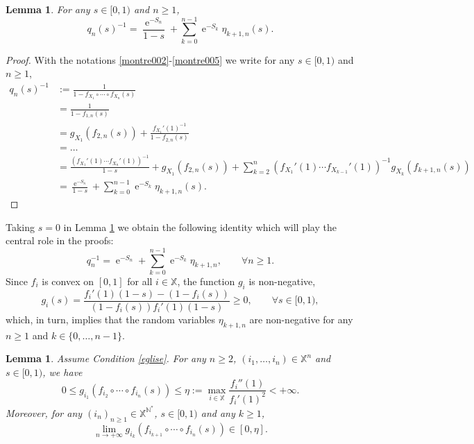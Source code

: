\documentclass[12pt]{amsart}
\newtheorem{lemma}[theorem]{Lemma}
\theoremstyle{definition}
\numberwithin{equation}{section}
\def\bb#1{\mathbb{#1}}
\def\geq{\geqslant}
\def\leq{\leqslant}
\DeclareMathOperator{\e}{e}
\begin{document}
\begin{lemma}
\label{foin}
For any $s\in [0,1)$ and $n \geq 1$,
\[
q_n(s)^{-1} = \frac{\e^{-S_n}}{1-s} + \sum_{k=0}^{n-1} \e^{-S_k} \eta_{k+1,n}(s).
\]
\end{lemma}

\begin{proof}
With the notations \eqref{montre002}-\eqref{montre005} we write for any $s\in [0,1)$ and $n \geq 1$,
\begin{align*}
	q_n(s)^{-1} &:= \frac{1}{1-f_{X_1} \circ \cdots \circ f_{X_n} (s)} \nonumber\\
	&= \frac{1}{1-f_{1,n} (s)} \nonumber\\
	&= g_{X_1} \left( f_{2,n}(s) \right) + \frac{f_{X_1}'(1)^{-1}}{1-f_{2,n}(s)} \nonumber\\
	&= \dots \nonumber\\
	&= \frac{\left( f_{X_1}'(1) \cdots f_{X_n}'(1) \right)^{-1}}{1-s} + g_{X_1} \left( f_{2,n}(s) \right) + \sum_{k=2}^{n} \left( f_{X_1}'(1) \cdots f_{X_{k-1}}'(1) \right)^{-1} g_{X_k} \left( f_{k+1,n}(s) \right) \nonumber\\
	&= \frac{\e^{-S_n}}{1-s} + \sum_{k=0}^{n-1} \e^{-S_k} \eta_{k+1,n}(s).
\end{align*}
\end{proof}

Taking $s=0$ in Lemma \ref{foin} we obtain the following identity which will play the central role in the proofs:
\begin{equation}
	\label{ciel}
	q_n^{-1} = \e^{-S_n} + \sum_{k=0}^{n-1} \e^{-S_k} \eta_{k+1,n}, \qquad \forall n \geq 1.
\end{equation}
Since $f_i$ is convex on $[0,1]$ for all $i \in \bb X$, the function $g_i$ is non-negative,
\begin{equation}
	\label{yeux}
	g_i(s) = \frac{f_i'(1)(1-s) - \left( 1-f_i(s) \right)}{\left( 1-f_i(s) \right)f_i'(1)(1-s)} \geq 0, \qquad  \forall s \in [0,1),
\end{equation}
which, in turn, implies that the random variables $\eta_{k+1,n}$ are non-negative for any $n \geq 1$ and $k \in \{0, \dots,n-1 \}$.

\begin{lemma} Assume Condition \ref{eglise}.
\label{pieuvre}
For any $n \geq 2$, $( i_1, \dots, i_n) \in \bb X^n$ and $s\in[0,1)$, we have
\[
0 \leq g_{i_1} \left( f_{i_2} \circ \cdots \circ f_{i_n} (s) \right) \leq \eta := \max_{i \in \bb X} \frac{f_i''(1)}{f_i'(1)^2} < +\infty.
\]
Moreover, for any $( i_n )_{n \geq 1} \in \bb X^{\bb N^*}$, $s\in[0,1)$ and any $k \geq 1$,
\begin{equation}
	\label{dorade}
	\lim_{n\to+\infty} g_{i_k} \left( f_{i_{k+1}} \circ \cdots \circ f_{i_n} (s) \right)  \in [0,\eta].
\end{equation}
\end{lemma}
\end{document}
